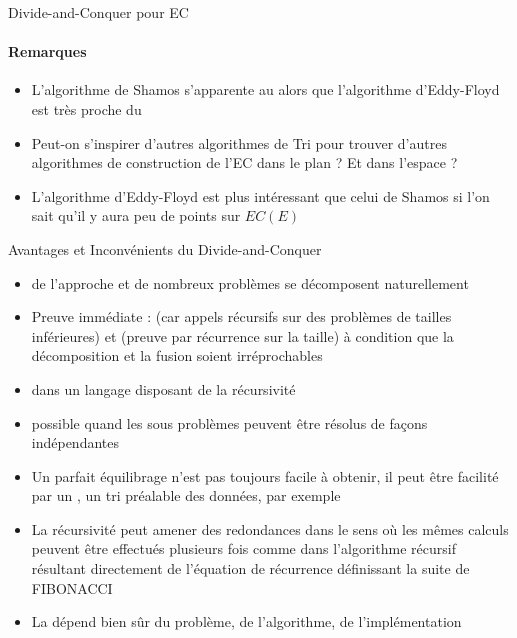 \documentclass[aspectratio=1610,francais,envcountsect]{beamer}
\begin{document}
\begin{frame}{Divide-and-Conquer pour EC}
  \framesubtitle{Remarques}

  \begin{itemize}
  \item L’algorithme de Shamos s’apparente au  alors que l’algorithme d’Eddy-Floyd est très proche du
  \item Peut-on s’inspirer d’autres algorithmes de Tri pour trouver
    d’autres algorithmes de construction de l’EC dans le plan ? Et
    dans l’espace ?
  \item L’algorithme d’Eddy-Floyd est plus intéressant que celui de
    Shamos si l’on sait qu’il y aura peu de points sur $EC(E)$

  \end{itemize}
\end{frame}


\begin{frame}{Avantages et Inconvénients du Divide-and-Conquer}

  \begin{itemize}
  \item {} de l’approche et de nombreux problèmes
    se décomposent naturellement
  \item Preuve immédiate :  (car appels récursifs
    sur des problèmes de tailles inférieures) et 
    (preuve par récurrence sur la taille) à condition que la
    décomposition et la fusion soient irréprochables
  \item{} dans un langage
    disposant de la récursivité
  \item {} possible quand les sous problèmes
    peuvent être résolus de façons indépendantes
  \item Un parfait équilibrage n’est pas toujours facile à obtenir, il
    peut être facilité par un , un tri
    préalable des données, par exemple
  \item La récursivité peut amener des redondances dans le sens où les
    mêmes calculs peuvent être effectués plusieurs fois comme dans
    l’algorithme récursif résultant directement de l’équation de
    récurrence définissant la suite de FIBONACCI
  \item La dépend bien
    sûr du problème, de l’algorithme, de l’implémentation
  \end{itemize}
\end{frame}
\end{document}
